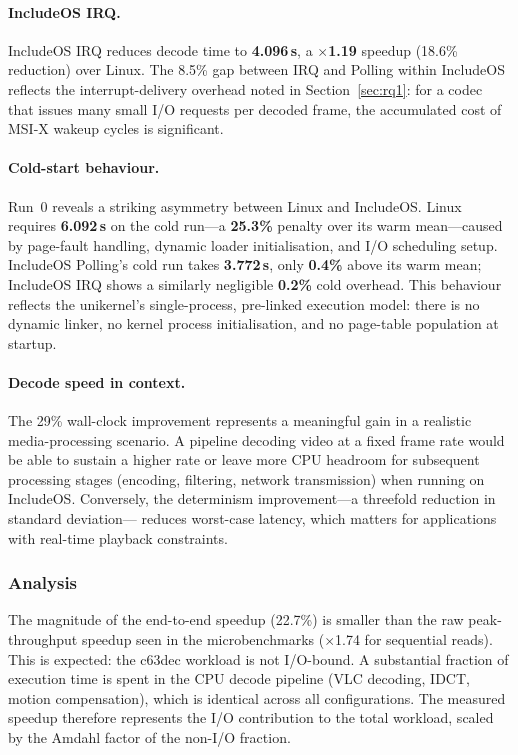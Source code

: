 \paragraph{IncludeOS IRQ.}
IncludeOS IRQ reduces decode time to \textbf{4.096\,s}, a
$\times$\textbf{1.19} speedup (18.6\% reduction) over Linux.  The 8.5\%
gap between IRQ and Polling within IncludeOS reflects the interrupt-delivery
overhead noted in Section~\ref{sec:rq1}: for a codec that issues many
small I/O requests per decoded frame, the accumulated cost of MSI-X wakeup
cycles is significant.

\paragraph{Cold-start behaviour.}
Run~0 reveals a striking asymmetry between Linux and IncludeOS.  Linux
requires \textbf{6.092\,s} on the cold run—a \textbf{25.3\%} penalty
over its warm mean—caused by page-fault handling, dynamic loader
initialisation, and I/O scheduling setup.  IncludeOS Polling's cold run
takes \textbf{3.772\,s}, only \textbf{0.4\%} above its warm mean;
IncludeOS IRQ shows a similarly negligible \textbf{0.2\%} cold overhead.
This behaviour reflects the unikernel's single-process, pre-linked
execution model: there is no dynamic linker, no kernel process
initialisation, and no page-table population at startup.

\paragraph{Decode speed in context.}
The 29\% wall-clock improvement represents a meaningful gain in a
realistic media-processing scenario.  A pipeline decoding video at a
fixed frame rate would be able to sustain a higher rate or leave more
CPU headroom for subsequent processing stages (encoding, filtering,
network transmission) when running on IncludeOS.  Conversely, the
determinism improvement—a threefold reduction in standard deviation—
reduces worst-case latency, which matters for applications with
real-time playback constraints.

\subsubsection{Analysis}

The magnitude of the end-to-end speedup (22.7\%) is smaller than the
raw peak-throughput speedup seen in the microbenchmarks ($\times$1.74 for
sequential reads).  This is expected: the c63dec workload is not
I/O-bound.  A substantial fraction of execution time is spent in the CPU
decode pipeline (VLC decoding, IDCT, motion compensation), which is
identical across all configurations.  The measured speedup therefore
represents the I/O contribution to the total workload, scaled by the
Amdahl factor of the non-I/O fraction.

